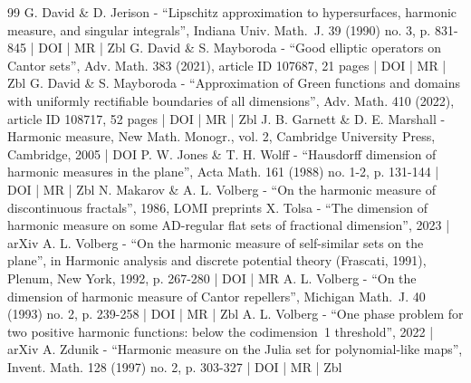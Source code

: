 \begin{thebibliography}{99}
G. David \& D. Jerison - “Lipschitz approximation to hypersurfaces, harmonic measure, and singular integrals”, Indiana Univ. Math. J. 39 (1990) no. 3, p. 831-845 | DOI | MR | Zbl
G. David \& S. Mayboroda - “Good elliptic operators on Cantor sets”, Adv. Math. 383 (2021), article ID 107687, 21 pages | DOI | MR | Zbl
G. David \& S. Mayboroda - “Approximation of Green functions and domains with uniformly rectifiable boundaries of all dimensions”, Adv. Math. 410 (2022), article ID 108717, 52 pages | DOI | MR | Zbl
J. B. Garnett \& D. E. Marshall - Harmonic measure, New Math. Monogr., vol. 2, Cambridge University Press, Cambridge, 2005 | DOI
P. W. Jones \& T. H. Wolff - “Hausdorff dimension of harmonic measures in the plane”, Acta Math. 161 (1988) no. 1-2, p. 131-144 | DOI | MR | Zbl
N. Makarov \& A. L. Volberg - “On the harmonic measure of discontinuous fractals”, 1986, LOMI preprints
X. Tolsa - “The dimension of harmonic measure on some AD-regular flat sets of fractional dimension”, 2023 | arXiv
A. L. Volberg - “On the harmonic measure of self-similar sets on the plane”, in Harmonic analysis and discrete potential theory (Frascati, 1991), Plenum, New York, 1992, p. 267-280 | DOI | MR
A. L. Volberg - “On the dimension of harmonic measure of Cantor repellers”, Michigan Math. J. 40 (1993) no. 2, p. 239-258 | DOI | MR | Zbl
A. L. Volberg - “One phase problem for two positive harmonic functions: below the codimension 1 threshold”, 2022 | arXiv
A. Zdunik - “Harmonic measure on the Julia set for polynomial-like maps”, Invent. Math. 128 (1997) no. 2, p. 303-327 | DOI | MR | Zbl
\end{thebibliography}
